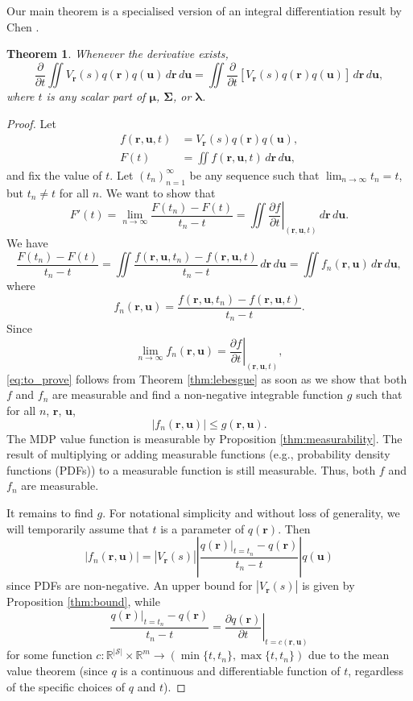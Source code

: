 \documentclass{article}
\newtheorem{theorem}{Theorem}[section]
\theoremstyle{definition}
\theoremstyle{remark}
\newcommand{\V}{V_{\mathbf{r}}}
\newcommand{\dt}{\frac{\partial}{\partial t}}
\newcommand{\f}{f(\mathbf{r}, \mathbf{u}, t)}
\newcommand{\ftn}{f(\mathbf{r}, \mathbf{u}, t_n)}
\newcommand{\fn}{f_n(\mathbf{r}, \mathbf{u})}
\newcommand{\dx}{\,d\mathbf{r}\,d\mathbf{u}}
\newcommand{\df}{\left.\frac{\partial f}{\partial t}\right|_{(\mathbf{r},
    \mathbf{u}, t)}}
\newcommand{\g}{g(\mathbf{r}, \mathbf{u})}
\begin{document}
Our main theorem is a specialised version of an integral differentiation result
by Chen \cite{lecture_notes}.
\begin{theorem} \label{thm:main}
  Whenever the derivative exists,
  \[
    \dt\iint
    \V(s)q(\mathbf{r})q(\mathbf{u})\dx
    = \iint
    \dt[\V(s)q(\mathbf{r})q(\mathbf{u})]\dx,
  \]
  where $t$ is any scalar part of $\bm\mu$, $\bm\Sigma$, or $\bm\lambda$.
\end{theorem}
\begin{proof}
  Let
  \begin{align*}
    \f &= \V(s)q(\mathbf{r})q(\mathbf{u}), \\
    F(t) &= \iint \f\dx,
  \end{align*}
  and fix the value of $t$. Let $(t_n)_{n=1}^\infty$ be any sequence such that
  $\lim_{n \to \infty} t_n = t$, but $t_n \ne t$ for all $n$. We want to show
  that
  \begin{equation} \label{eq:to_prove}
    F'(t) = \lim_{n \to \infty} \frac{F(t_n) - F(t)}{t_n - t} = \iint \df\dx.
  \end{equation}
  We have
  \[
    \frac{F(t_n) - F(t)}{t_n - t} = \iint \frac{\ftn - \f}{t_n - t}\dx =
    \iint \fn\dx,
  \]
  where
  \[
    \fn = \frac{\ftn - \f}{t_n - t}.
  \]
  Since
  \[
    \lim_{n \to \infty} \fn = \df,
  \]
  \eqref{eq:to_prove} follows from Theorem \ref{thm:lebesgue} as soon as we show
  that both $f$ and $f_n$ are measurable and find a non-negative integrable
  function $g$ such that for all $n$, $\mathbf{r}$, $\mathbf{u}$,
  \[
    |\fn| \le \g.
  \]
  The MDP value function is measurable by Proposition \ref{thm:measurability}.
  The result of multiplying or adding measurable functions (e.g., probability
  density functions (PDFs)) to a measurable function is still measurable. Thus,
  both $f$ and $f_n$ are measurable.

  It remains to find $g$. For notational simplicity and without loss of
  generality, we will temporarily assume that $t$ is a parameter of
  $q(\mathbf{r})$. Then
  \[
    |\fn| = |\V(s)| \left| \frac{q(\mathbf{r})|_{t =
          t_n} - q(\mathbf{r})}{t_n - t} \right| q(\mathbf{u})
  \]
  since PDFs are non-negative. An upper bound for
  $|\V(s)|$ is given by Proposition \ref{thm:bound}, while
  \[
    \frac{q(\mathbf{r})|_{t = t_n} - q(\mathbf{r})}{t_n - t} = \left.
      \frac{\partial q(\mathbf{r})}{\partial t} \right|_{t = c(\mathbf{r},
      \mathbf{u})}
  \]
  for some function $c : \mathbb{R}^{|\mathcal{S}|} \times \mathbb{R}^m \to
  (\min\{t, t_n\}, \max\{t, t_n\})$ due to the mean value theorem (since $q$ is
  a continuous and differentiable function of $t$, regardless of the specific
  choices of $q$ and $t$).


\end{proof}
\end{document}

